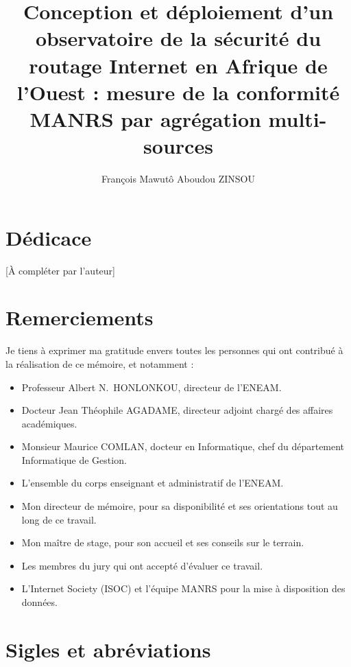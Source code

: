 \documentclass{eneam}
\title{Conception et déploiement d'un observatoire de la sécurité du routage Internet en Afrique de l'Ouest : mesure de la conformité MANRS par agrégation multi-sources}
\author{François Mawutô Aboudou ZINSOU}
\begin{document}
\maketitle

\setcounter{figure}{0}

\newpage
{}

\chapter*{Dédicace}

[À compléter par l'auteur]

\chapter*{Remerciements}

Je tiens à exprimer ma gratitude envers toutes les personnes qui ont contribué à la réalisation de ce mémoire, et notamment :

\begin{itemize}
    \item Professeur Albert N.\ HONLONKOU, directeur de l'ENEAM.
    \item Docteur Jean Théophile AGADAME, directeur adjoint chargé des affaires académiques.
    \item Monsieur Maurice COMLAN, docteur en Informatique, chef du département Informatique de Gestion.
    \item L'ensemble du corps enseignant et administratif de l'ENEAM.
    \item Mon directeur de mémoire, pour sa disponibilité et ses orientations tout au long de ce travail.
    \item Mon maître de stage, pour son accueil et ses conseils sur le terrain.
    \item Les membres du jury qui ont accepté d'évaluer ce travail.
    \item L'Internet Society (ISOC) et l'équipe MANRS pour la mise à disposition des données.
\end{itemize}

\chapter*{Sigles et abréviations}
\end{document}
